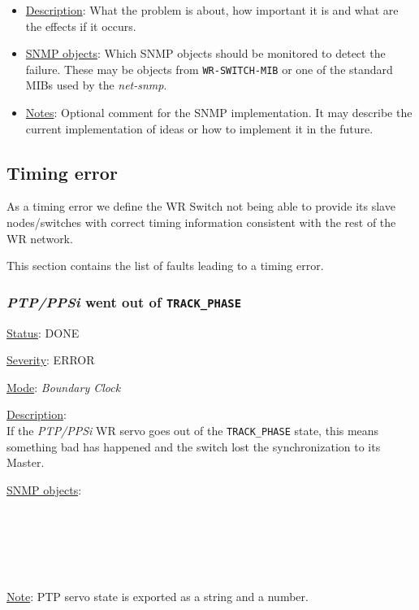 \begin{itemize}[leftmargin=0pt]
	\item [] \underline{Description}: What the problem is about, how important it
		is and what are the effects if it occurs.
	\item [] \underline{SNMP objects}: Which SNMP objects should be monitored to
		detect the failure. These may be objects from \texttt{WR-SWITCH-MIB} or one
		of the standard MIBs used by the \emph{net-snmp}.
	\item [] \underline{Notes}: Optional comment for the SNMP implementation. It
    may describe the current implementation of ideas or how to implement it in
    the future.
\end{itemize}

\subsection{Timing error}
\label{sec:timing_fail}
As a timing error we define the WR Switch not being able to provide its slave
nodes/switches with correct timing information consistent with the rest of the
WR network.

\noindent This section contains the list of faults leading to a timing error.

\subsubsection{\bf \emph{PTP/PPSi} went out of \texttt{TRACK\_PHASE}}
		\label{fail:timing:ppsi_track_phase}
    \begin{pck_descr}
			\item [] \underline{Status}: DONE
			\item [] \underline{Severity}: ERROR
			\item [] \underline{Mode}: \emph{Boundary Clock}
			\item [] \underline{Description}:\\
				If the \emph{PTP/PPSi} WR servo goes out of the \texttt{TRACK\_PHASE}
				state, this means something bad has happened and the switch lost the
				synchronization to its Master.
			\item [] \underline{SNMP objects}:\\
        {\footnotesize
				\\
				\\
				\\
				 \\
				 \\
         }

			\item [] \underline{Note}: PTP servo state is exported as a string and a number.
		\end{pck_descr}

